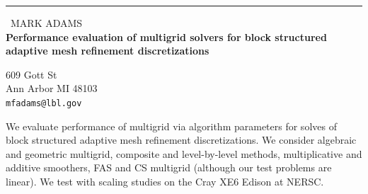 \documentclass{report}
\begin{document}
\begin{center}
\rule{6in}{1pt} \
{\large MARK ADAMS \\
{\bf Performance evaluation of multigrid solvers for block structured adaptive mesh refinement discretizations}}

609 Gott St \\ Ann Arbor MI 48103
\\
{\tt mfadams@lbl.gov}\end{center}

We evaluate performance of multigrid via algorithm parameters for solves
of block structured adaptive mesh refinement discretizations. We consider
algebraic and geometric multigrid, composite and level-by-level methods,
multiplicative and additive smoothers, FAS and CS multigrid (although our
test problems are linear). We test with scaling studies on the Cray XE6
Edison at NERSC.
\end{document}
